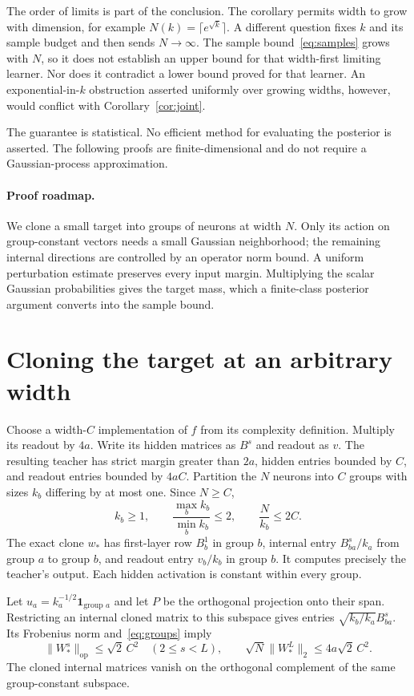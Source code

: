 \documentclass[11pt]{article}
\theoremstyle{remark}\newtheorem{remark}[theorem]{Remark}
\begin{document}
The order of limits is part of the conclusion. The corollary permits width
to grow with dimension, for example $N(k)=\lceil e^{\sqrt{k}}\rceil$.
A different question fixes $k$ and its sample budget and then sends
$N\to\infty$. The sample bound~\eqref{eq:samples} grows with $N$, so it
does not establish an upper bound for that width-first limiting learner.
Nor does it contradict a lower bound proved for that learner.
An exponential-in-$k$ obstruction asserted uniformly over growing widths,
however, would conflict with Corollary~\ref{cor:joint}.

The guarantee is statistical. No efficient method for evaluating the
posterior is asserted. The following proofs are finite-dimensional and
do not require a Gaussian-process approximation.

\paragraph{Proof roadmap.}
We clone a small target into groups of neurons at width $N$. Only its
action on group-constant vectors needs a small Gaussian neighborhood;
the remaining internal directions are controlled by an operator norm
bound. A uniform perturbation estimate preserves every input margin.
Multiplying the scalar Gaussian probabilities gives the target mass,
which a finite-class posterior argument converts into the sample bound.

\section{Cloning the target at an arbitrary width}
Choose a width-$C$ implementation of $f$ from its complexity definition.
Multiply its readout by $4a$. Write its hidden matrices as $B^s$ and
readout as $v$. The resulting teacher has strict margin greater than $2a$,
hidden entries bounded by $C$, and readout entries bounded by $4aC$.
Partition the $N$ neurons into $C$ groups with sizes $k_b$ differing by
at most one. Since $N\ge C$,
\begin{equation}\label{eq:groups}
 k_b\ge1,\qquad \frac{\max_b k_b}{\min_b k_b}\le2,
 \qquad \frac{N}{k_b}\le2C.
\end{equation}
The exact clone $w_*$ has first-layer row $B_b^1$ in group $b$, internal
entry $B^s_{ba}/k_a$ from group $a$ to group $b$, and readout entry
$v_b/k_b$ in group $b$. It computes precisely the teacher's output.
Each hidden activation is constant within every group.

Let $u_a=k_a^{-1/2}\mathbf1_{\text{group }a}$ and let $P$ be the
orthogonal projection onto their span. Restricting an internal cloned
matrix to this subspace gives entries $\sqrt{k_b/k_a}B^s_{ba}$.
Its Frobenius norm and~\eqref{eq:groups} imply
\begin{equation}\label{eq:clone-norms}
 \|W_*^s\|_{\mathrm{op}}\le\sqrt2\,C^2\quad(2\le s<L),
 \qquad \sqrt N\|W_*^L\|_2\le4a\sqrt2\,C^2.
\end{equation}
The cloned internal matrices vanish on the orthogonal complement of the
same group-constant subspace.
\end{document}
